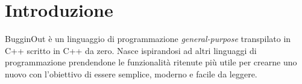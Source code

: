 
\chapter*{Introduzione}
\label{chap:introduzione}


BugginOut \`e un linguaggio di programmazione \textit{general-purpose} transpilato in C++ scritto in C++ da zero. Nasce ispirandosi ad altri linguaggi di programmazione prendendone le funzionalit\`a ritenute pi\`u utile per crearne uno nuovo con l'obiettivo di essere semplice, moderno e facile da leggere.


